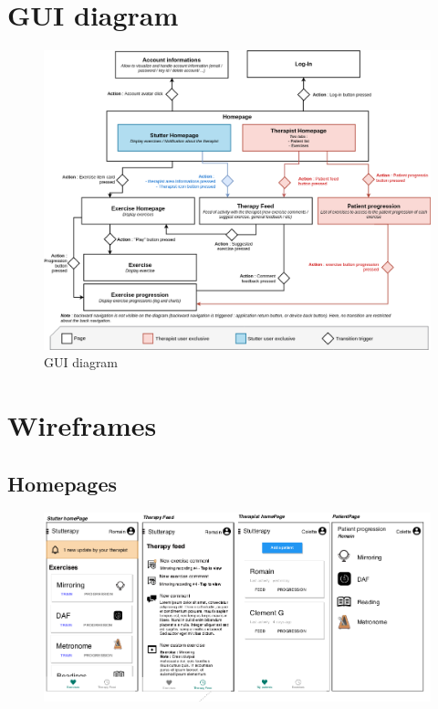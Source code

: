 \begin{appendices}
\chapter{GUI diagram}
\label{appendix:ihm}
\begin{figure}[H]
  \includegraphics[width=1\linewidth]{content/imgs/IHM_diagram.png}
  \caption*{GUI diagram}
\end{figure}


\chapter{Wireframes}
\label{appendix:wireframes}
\section{Homepages}
\begin{figure}[H]
  \includegraphics[width=1\linewidth]{content/imgs/maquette1.png}
\end{figure}


\end{appendices}
